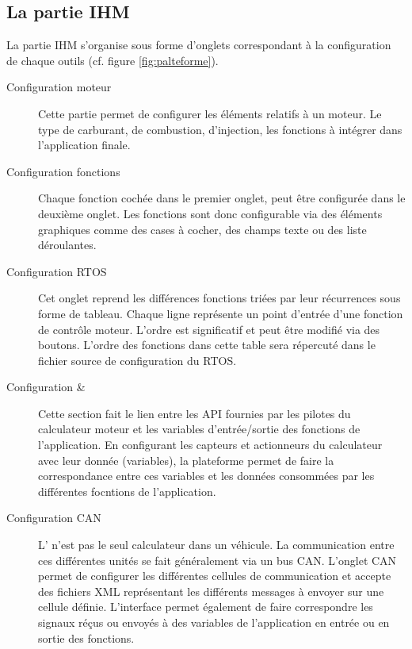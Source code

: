 \subsection{La partie IHM}
La partie IHM s'organise sous forme d'onglets correspondant à la configuration de chaque outils (cf. figure \ref{fig:palteforme}). 
\begin{description}
  \item[Configuration moteur] Cette partie permet de configurer les éléments relatifs à un moteur. Le type de carburant, de combustion, d'injection, les fonctions à intégrer dans l'application finale.
  \item[Configuration fonctions] Chaque fonction cochée dans le premier onglet, peut être configurée dans le deuxième onglet. Les fonctions sont donc configurable via des éléments graphiques comme des cases à cocher, des champs texte ou des liste déroulantes.
  \item[Configuration RTOS] Cet onglet reprend les différences fonctions triées par leur récurrences sous forme de tableau. Chaque ligne représente un point d'entrée d'une fonction de contrôle moteur. L'ordre est significatif et peut être modifié via des boutons. L'ordre des fonctions dans cette table sera répercuté dans le fichier source de configuration du RTOS.
  \item[Configuration  \& ] Cette section fait le lien entre les API fournies par les pilotes du calculateur moteur et les variables d'entrée/sortie des fonctions de l'application. En configurant les capteurs et actionneurs du calculateur avec leur donnée (variables), la plateforme permet de faire la correspondance entre ces variables et les données consommées par les différentes focntions de l'application.
  \item[Configuration CAN] L' n'est pas le seul calculateur dans un véhicule. La communication entre ces différentes unités se fait généralement via un bus CAN. L'onglet CAN permet de configurer les différentes cellules de communication et accepte des fichiers XML représentant les différents messages à envoyer sur une cellule définie. L'interface permet également de faire correspondre les signaux réçus ou envoyés à des variables de l'application en entrée ou en sortie des fonctions.
\end{description}

